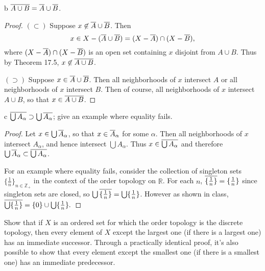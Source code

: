 \documentclass[11pt]{article}
\begin{document}
\begin{p}{b}
  \({ \overline{A \cup B} } = { \overline{A} } \cup { \overline{B} }\).
\end{p}

\begin{proof}
  $(\subset)$ Suppose $x \not\in { \overline{A} } \cup { \overline{B} }$. Then
  \[ x \in X - ({ \overline{A} } \cup { \overline{B} }) = (X - { \overline{A} }) \cap (X - { \overline{B} }),\]
  where $(X - { \overline{A} }) \cap (X - { \overline{B} })$ is an open set containing $x$
  disjoint from $A \cup B$. Thus by Theorem 17.5, $x \not\in { \overline{A \cup
  B} }$.

  $(\supset)$ Suppose $x \in { \overline{A} } \cup { \overline{B} }$. Then all neighborhoods
  of $x$ intersect $A$ or all neighborhoods of $x$ intersect $B$. Then of
  course, all neighborhoods of $x$ intersect $A \cup B$, so that $x \in { \overline{A \cup
  B} }$.
\end{proof}

\begin{p}{c}
  \({ \overline{\bigcup A_\alpha} } \supset \bigcup { \overline{A_\alpha} }\); give an
  example where equality fails.
\end{p}

\begin{proof}
  Let $x \in \bigcup { \overline{A} }_\alpha$, so that $x \in { \overline{A} }_\alpha$ for
  some $\alpha$. Then all neighborhoods of $x$ intersect $A_\alpha$, and hence
  intersect $\bigcup A_\alpha$. Thus $x \in { \overline{\bigcup A_\alpha} }$ and
  therefore
  $\bigcup { \overline{A} }_\alpha \subset { \overline{\bigcup A_\alpha} }$.

  For an example where equality fails, consider the collection of singleton sets
  $\{\frac{1}{n}\}_{n \in \mathbb{Z}_+}$ in the context of the order topology on
  $\mathbb{R}$. For each $n$, ${ \overline{\{\frac{1}{n}\}} } = \{\frac{1}{n}\}$ since
  singleton sets are closed, so $\bigcup { \overline{\{\frac{1}{n}\}} } = \bigcup
  \{\frac{1}{n}\}$. However as shown in class, ${ \overline{\bigcup
  \{\frac{1}{n}\}} } = \{0\} \cup \bigcup \{\frac{1}{n}\}.$
\end{proof}


\noindent Show that if $X$ is an ordered set for which the order topology is the discrete
topology, then every element of $X$ except the largest one (if there is a largest
one) has an immediate successor. Through a practically identical proof, it's also
possible to show that every element except the smallest one (if there is a
smallest one) has an immediate predecessor.
\end{document}
